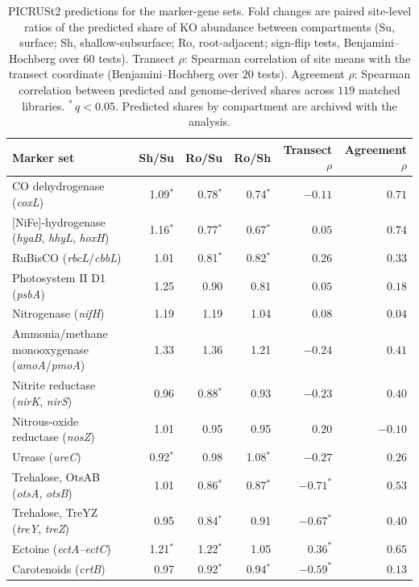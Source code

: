 \begin{table}[htbp]
\centering\scriptsize
\caption{PICRUSt2 predictions for the marker-gene sets. Fold changes are paired
site-level ratios of the predicted share of KO abundance between compartments
(Su, surface; Sh, shallow-subsurface; Ro, root-adjacent; sign-flip tests,
Benjamini--Hochberg over $60$ tests). Transect $\rho$: Spearman correlation of
site means with the transect coordinate (Benjamini--Hochberg over $20$ tests).
Agreement $\rho$: Spearman correlation between predicted and genome-derived
shares across $119$ matched libraries. $^{*}$\,$q<0.05$. Predicted shares by
compartment are archived with the analysis.}
\label{tab:traits_picrust}
\begin{tabular}{P{4.2cm}rrrrr}
\toprule
Marker set & Sh/Su & Ro/Su & Ro/Sh & Transect $\rho$ & Agreement $\rho$ \\
\midrule
CO dehydrogenase (\textit{coxL}) & 1.09$^{*}$ & 0.78$^{*}$ & 0.74$^{*}$ & $-0.11$ & $0.71$ \\
{[NiFe]}-hydrogenase (\textit{hyaB}, \textit{hhyL}, \textit{hoxH}) & 1.16$^{*}$ & 0.77$^{*}$ & 0.67$^{*}$ & $0.05$ & $0.74$ \\
RuBisCO (\textit{rbcL}/\textit{cbbL}) & 1.01 & 0.81$^{*}$ & 0.82$^{*}$ & $0.26$ & $0.33$ \\
Photosystem II D1 (\textit{psbA}) & 1.25 & 0.90 & 0.81 & $0.05$ & $0.18$ \\
Nitrogenase (\textit{nifH}) & 1.19 & 1.19 & 1.04 & $0.08$ & $0.04$ \\
Ammonia/methane monooxygenase (\textit{amoA}/\textit{pmoA}) & 1.33 & 1.36 & 1.21 & $-0.24$ & $0.41$ \\
Nitrite reductase (\textit{nirK}, \textit{nirS}) & 0.96 & 0.88$^{*}$ & 0.93 & $-0.23$ & $0.40$ \\
Nitrous-oxide reductase (\textit{nosZ}) & 1.01 & 0.95 & 0.95 & $0.20$ & $-0.10$ \\
Urease (\textit{ureC}) & 0.92$^{*}$ & 0.98 & 1.08$^{*}$ & $-0.27$ & $0.26$ \\
Trehalose, OtsAB (\textit{otsA}, \textit{otsB}) & 1.01 & 0.86$^{*}$ & 0.87$^{*}$ & $-0.71^{*}$ & $0.53$ \\
Trehalose, TreYZ (\textit{treY}, \textit{treZ}) & 0.95 & 0.84$^{*}$ & 0.91 & $-0.67^{*}$ & $0.40$ \\
Ectoine (\textit{ectA}--\textit{ectC}) & 1.21$^{*}$ & 1.22$^{*}$ & 1.05 & $0.36^{*}$ & $0.65$ \\
Carotenoids (\textit{crtB}) & 0.97 & 0.92$^{*}$ & 0.94$^{*}$ & $-0.59^{*}$ & $0.13$ \\

\end{tabular}
\end{table}
